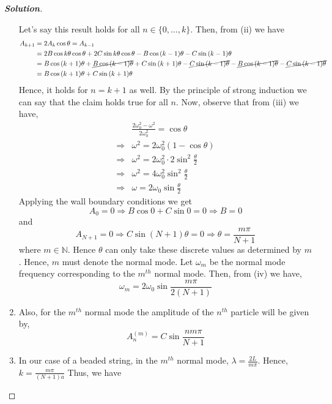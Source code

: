 \documentclass[10pt]{scrartcl}
\theoremstyle{definition}
\newenvironment{solution} {\begin{proof}[\normalfont \textbf{Solution}]} {\end{proof}}
\newcommand{\nn}{\mathbb{N}}
\begin{document}
\begin{solution}
\begin{enumerate}[label={(\alph*)}]
            Let's say this result holds for all $n \in \{0,\dots,k\}$. Then, from (ii) we have 
            \begin{align*}
                A_{k+1} &= 2A_k\cos\theta = A_{k-1} \\ 
                        &=2B\cos{k\theta}\cos\theta + 2C\sin{k\theta}\cos\theta - B\cos{(k-1)\theta} - C\sin{(k-1)\theta} \\ 
                        &=B\cos{(k+1)\theta} + \cancel{B\cos{(k-1)\theta}} + C\sin{(k+1)\theta} - \cancel{C\sin{(k-1)\theta}}- \cancel{B\cos{(k-1)\theta}} - \cancel{C\sin{(k-1)\theta}} \\ 
                        &=B\cos{(k+1)\theta} + C\sin{(k+1)\theta}
            \end{align*}
            Hence, it holds for $n = k+1$ as well. By the principle of strong induction we can say that the claim holds true for all $n$.
            Now, observe that from (iii) we have, 
            \begin{align*}
                &\frac{2\omega_0^2 - \omega^2}{2\omega_0^2} = \cos\theta \\ 
                \Rightarrow &\omega^2 = 2\omega_0^2(1- \cos\theta) \\ 
                \Rightarrow &\omega^2 = 2\omega_0^2 \cdot 2\sin^2\frac{\theta}{2} \\ 
                \Rightarrow &\omega^2 = 4\omega_0^2\sin^2\frac{\theta}{2} \\
                \Rightarrow &\omega = 2\omega_0\sin\frac{\theta}{2} \tag{iv}
            \end{align*}
            Applying the wall boundary conditions we get 
            $$A_0 = 0 \Rightarrow B\cos0 + C\sin0 = 0 \Rightarrow \boxed{B = 0}$$
            and 
            $$A_{N + 1} = 0 \Rightarrow C\sin{(N + 1)\theta} = 0 \Rightarrow \boxed{\theta = \frac{m\pi}{N + 1}}$$
            where $m \in \nn$. Hence $\theta$ can only take these discrete values as determined by $m$. Hence, $m$ must denote the normal mode. 
            Let $\omega_m$ be the normal mode frequency corresponding to the $m^{th}$ normal mode.
            Then, from (iv) we have,
            $$\boxed{\omega_m = 2\omega_0 \sin{\frac{m\pi}{2(N+1)}}}$$
        \item Also, for the $m^{th}$ normal mode the amplitude of the $n^{th}$ particle
            will be given by,
            $$\boxed{A_n^{( m )} = C\sin{\frac{nm\pi}{N+1}}}$$
        \item 
            In our case of a beaded string, in the $m^{th}$ normal mode, $\lambda = \frac{2L}{m\pi}$. Hence, $k = \frac{m\pi}{(N+1)a}$ Thus, we have 

\end{enumerate}
\end{solution}
\end{document}

